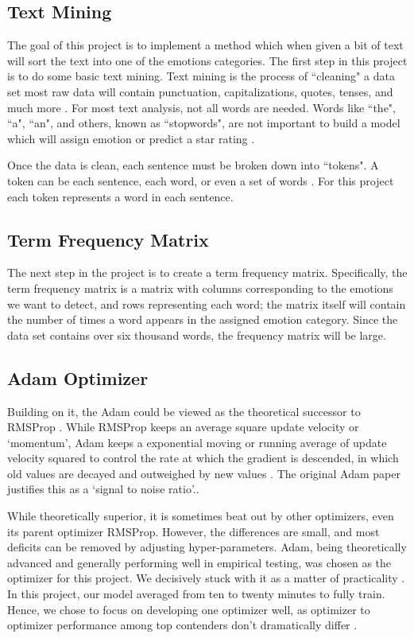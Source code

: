 \documentclass[titlepage,letterpaper]{article}
\begin{document}
\subsection{Text Mining}
The goal of this project is to implement a method which when given a bit of text will sort the text into one of the emotions categories. The first step in this project is to do some basic text mining. Text mining is the process of ``cleaning" a data set most raw data will contain punctuation, capitalizations, quotes, tenses, and much more \cite{TextMining}. For most text analysis, not all words are needed. Words like ``the", ``a", ``an", and others, known as ``stopwords", are not important to build a model which will assign emotion or predict a star rating \cite{TextMining}. 

Once the data is clean, each sentence must be broken down into ``tokens". A token can be each sentence, each word, or even a set of words \cite{TextMining}. For this project each token represents a word in each sentence. 

\subsection{Term Frequency Matrix}
The next step in the project is to create a term frequency matrix. Specifically, the term frequency matrix is a matrix with columns corresponding to the emotions we want to detect, and rows representing each word; the matrix itself will contain the number of times a word appears in the assigned emotion category. Since the data set contains over six thousand words, the frequency matrix will be large.

\subsection{Adam Optimizer}

Building on it, the Adam could be viewed as the theoretical successor to RMSProp \cite{adam}. While RMSProp keeps an average square update velocity or `momentum'\cite{rmsprop}, Adam keeps a exponential moving or running average of update velocity squared to control the rate at which the gradient is descended, in which old values are decayed and outweighed by new values \cite{adam}. The original Adam paper justifies this as a `signal to noise ratio'.\cite{adam}.

While theoretically superior, it is sometimes beat out by other optimizers, even its parent optimizer RMSProp. However, the differences are small, and most deficits can be removed by adjusting hyper-parameters. Adam, being theoretically advanced and generally performing well in empirical testing, was chosen as the optimizer for this project. We decisively stuck with it as a matter of practicality \cite{learn}. In this project, our model averaged from ten to twenty minutes to fully train. Hence, we chose to focus on developing one optimizer well, as optimizer to optimizer performance among top contenders don't dramatically differ \cite{learn}.
\end{document}
